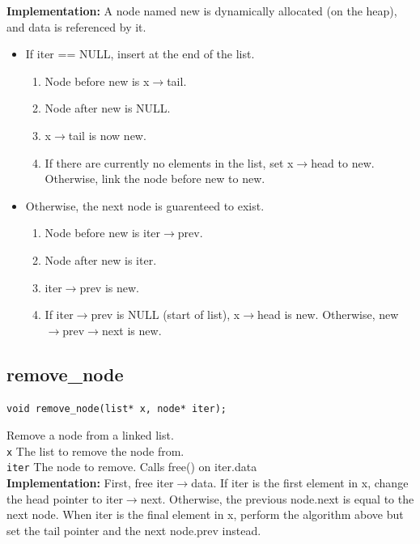 \documentclass{article}
\begin{document}
 
 \textbf{Implementation:}
 A node named new is dynamically allocated (on the heap),
     and  data is referenced by it.
     \begin{itemize}
 \item If  iter == NULL, insert at the end of the list.
    \begin{enumerate}
     \item Node before new is  x$\rightarrow$tail.
     \item Node after new is NULL.
     \item  x$\rightarrow$tail is now new.
     \item If there are currently no elements in the list,
             set x$\rightarrow$head to new. Otherwise, link the node before
             new to new.
    \end{enumerate}
 \item Otherwise, the next node is guarenteed to exist.
    \begin{enumerate}
     \item Node before new is  iter$\rightarrow$prev.
     \item Node after new is iter.
     \item  iter$\rightarrow$prev is new.
     \item If iter$\rightarrow$prev is NULL (start of list),  x$\rightarrow$head is new.
         Otherwise, new$\rightarrow$prev$\rightarrow$next is new.
    \end{enumerate}
 \end{itemize}

\subsection{remove\_node}
\begin{lstlisting}
void remove_node(list* x, node* iter);
\end{lstlisting}


  Remove a node from a linked list.\\ 
 \texttt{x} The list to remove the node from.\\ 
 \texttt{iter} The node to remove.
  Calls  free() on  iter.data\\ 
 
 
 \textbf{Implementation:}
First, free  iter$\rightarrow$data.
If  iter is the first element in  x,
 change the head pointer to  iter$\rightarrow$next.
Otherwise, the previous node.next is equal to the
 next node.
When  iter is the final element in  x,
 perform the algorithm above but set the tail pointer
 and the next node.prev instead.
 
\end{document}
